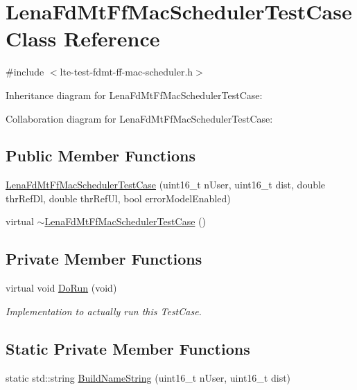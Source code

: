 \hypertarget{classLenaFdMtFfMacSchedulerTestCase}{}\section{Lena\+Fd\+Mt\+Ff\+Mac\+Scheduler\+Test\+Case Class Reference}
\label{classLenaFdMtFfMacSchedulerTestCase}


{\ttfamily \#include $<$lte-\/test-\/fdmt-\/ff-\/mac-\/scheduler.\+h$>$}



Inheritance diagram for Lena\+Fd\+Mt\+Ff\+Mac\+Scheduler\+Test\+Case\+:


Collaboration diagram for Lena\+Fd\+Mt\+Ff\+Mac\+Scheduler\+Test\+Case\+:
\subsection*{Public Member Functions}
\begin{DoxyCompactItemize}
\item 
\hyperlink{classLenaFdMtFfMacSchedulerTestCase_a7f4db4c6d52003776b3394efdb678278}{Lena\+Fd\+Mt\+Ff\+Mac\+Scheduler\+Test\+Case} (uint16\+\_\+t n\+User, uint16\+\_\+t dist, double thr\+Ref\+Dl, double thr\+Ref\+Ul, bool error\+Model\+Enabled)
\item 
virtual \hyperlink{classLenaFdMtFfMacSchedulerTestCase_a152ec02914e5b2b234d1c37f71a9cd99}{$\sim$\+Lena\+Fd\+Mt\+Ff\+Mac\+Scheduler\+Test\+Case} ()
\end{DoxyCompactItemize}
\subsection*{Private Member Functions}
\begin{DoxyCompactItemize}
\item 
virtual void \hyperlink{classLenaFdMtFfMacSchedulerTestCase_a5cfc445b7daa4a02df317b46ee007f1a}{Do\+Run} (void)
\begin{DoxyCompactList}\small\item\em Implementation to actually run this Test\+Case. \end{DoxyCompactList}\end{DoxyCompactItemize}
\subsection*{Static Private Member Functions}
\begin{DoxyCompactItemize}
\item 
static std\+::string \hyperlink{classLenaFdMtFfMacSchedulerTestCase_aa147ecbe75504db5e57cc09aa9d8fe43}{Build\+Name\+String} (uint16\+\_\+t n\+User, uint16\+\_\+t dist)
\end{DoxyCompactItemize}
